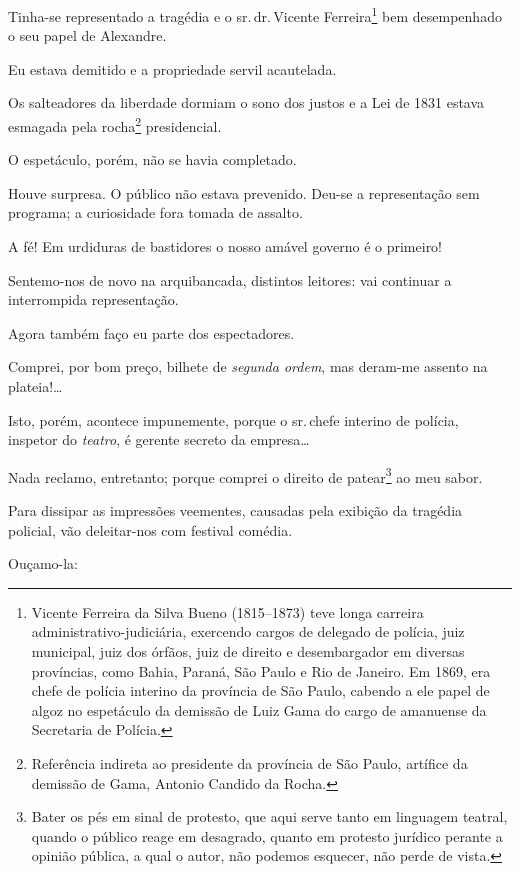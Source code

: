 Tinha-se representado a tragédia e o sr.\,dr.\,Vicente Ferreira\footnote{
  Vicente Ferreira da Silva Bueno (1815--1873) teve longa carreira
  administrativo-judiciária, exercendo cargos de delegado de polícia,
  juiz municipal, juiz dos órfãos, juiz de direito e desembargador em
  diversas províncias, como Bahia, Paraná, São Paulo e Rio de Janeiro.
  Em 1869, era chefe de polícia interino da província de São Paulo,
  cabendo a ele papel de algoz no espetáculo da demissão de Luiz Gama do
  cargo de amanuense da Secretaria de Polícia.} bem desempenhado o seu
papel de Alexandre.

Eu estava demitido e a propriedade servil acautelada.

Os salteadores da liberdade dormiam o sono dos justos e a Lei de 1831
estava esmagada pela rocha\footnote{Referência indireta ao presidente
  da província de São Paulo, artífice da demissão de Gama, Antonio
  Candido da Rocha.} presidencial.

O espetáculo, porém, não se havia completado.

Houve surpresa. O público não estava prevenido. Deu-se a representação
sem programa; a curiosidade fora tomada de assalto.

A fé! Em urdiduras de bastidores o nosso amável governo é o primeiro!

Sentemo-nos de novo na arquibancada, distintos leitores: vai continuar a
interrompida representação.

Agora também faço eu parte dos espectadores.

Comprei, por bom preço, bilhete de \emph{segunda ordem}, mas deram-me
assento na plateia!\ldots{}

Isto, porém, acontece impunemente, porque o sr.\,chefe interino de
polícia, inspetor do \emph{teatro}, é gerente secreto da empresa\ldots{}

Nada reclamo, entretanto; porque comprei o direito de patear\footnote{
  Bater os pés em sinal de protesto, que aqui serve tanto em linguagem
  teatral, quando o público reage em desagrado, quanto em protesto
  jurídico perante a opinião pública, a qual o autor, não podemos
  esquecer, não perde de vista.} ao meu sabor.

Para dissipar as impressões veementes, causadas pela exibição da
tragédia policial, vão deleitar-nos com festival comédia.

Ouçamo-la:

